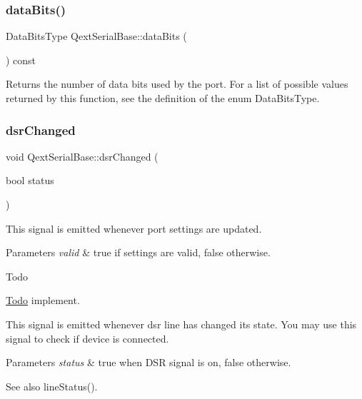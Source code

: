 \subsubsection{\texorpdfstring{data\+Bits()}{dataBits()}}
{\footnotesize\ttfamily Data\+Bits\+Type Qext\+Serial\+Base\+::data\+Bits (\begin{DoxyParamCaption}{ }\end{DoxyParamCaption}) const\hspace{0.3cm}{\ttfamily [virtual]}}

Returns the number of data bits used by the port. For a list of possible values returned by this function, see the definition of the enum Data\+Bits\+Type. \mbox{\label{class_qext_serial_base_abc9dc7c9a7735476800eb5aa35bec6a8}} 
\subsubsection{\texorpdfstring{dsr\+Changed}{dsrChanged}}
{\footnotesize\ttfamily void Qext\+Serial\+Base\+::dsr\+Changed (\begin{DoxyParamCaption}\item[{bool}]{status }\end{DoxyParamCaption})\hspace{0.3cm}{\ttfamily [signal]}}

This signal is emitted whenever port settings are updated. 
\begin{DoxyParams}{Parameters}
{\em valid} & {\ttfamily true} if settings are valid, {\ttfamily false} otherwise.\\
\hline
\end{DoxyParams}
\begin{DoxyRefDesc}{Todo}
\item[\mbox{\hyperlink{todo__todo000001}{Todo}}]implement. \end{DoxyRefDesc}


This signal is emitted whenever dsr line has changed its state. You may use this signal to check if device is connected. 
\begin{DoxyParams}{Parameters}
{\em status} & {\ttfamily true} when D\+SR signal is on, {\ttfamily false} otherwise.\\
\hline
\end{DoxyParams}
\begin{DoxySeeAlso}{See also}
line\+Status(). 
\end{DoxySeeAlso}
\mbox{\label{class_qext_serial_base_a099a89f5492e6ff387dd29132cc3ccd0}} 
